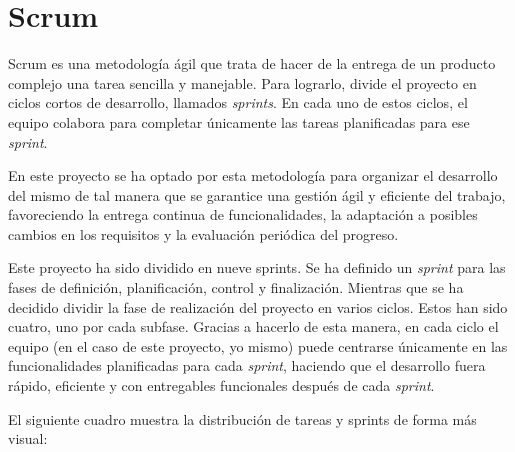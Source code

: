 \section{Scrum}

Scrum es una metodología ágil que trata de hacer de la entrega de un producto complejo una tarea sencilla y manejable. Para lograrlo, divide el proyecto en ciclos cortos de desarrollo, llamados \textit{sprints}. En cada uno de estos ciclos, el equipo colabora para completar únicamente las tareas planificadas para ese \textit{sprint}. \cite{scrum}

En este proyecto se ha optado por esta metodología para organizar el desarrollo del mismo de tal manera que se garantice una gestión ágil y eficiente del trabajo, favoreciendo la entrega continua de funcionalidades, la adaptación a posibles cambios en los requisitos y la evaluación periódica del progreso.

Este proyecto ha sido dividido en nueve sprints. Se ha definido un \textit{sprint} para las fases de definición, planificación, control y finalización. Mientras que se ha decidido dividir la fase de realización del proyecto en varios ciclos. Estos han sido cuatro, uno por cada subfase. Gracias a hacerlo de esta manera, en cada ciclo el equipo (en el caso de este proyecto, yo mismo) puede centrarse únicamente en las funcionalidades planificadas para cada \textit{sprint}, haciendo que el desarrollo fuera rápido, eficiente y con entregables funcionales después de cada \textit{sprint}.

El siguiente cuadro muestra la distribución de tareas y sprints de forma más visual:

